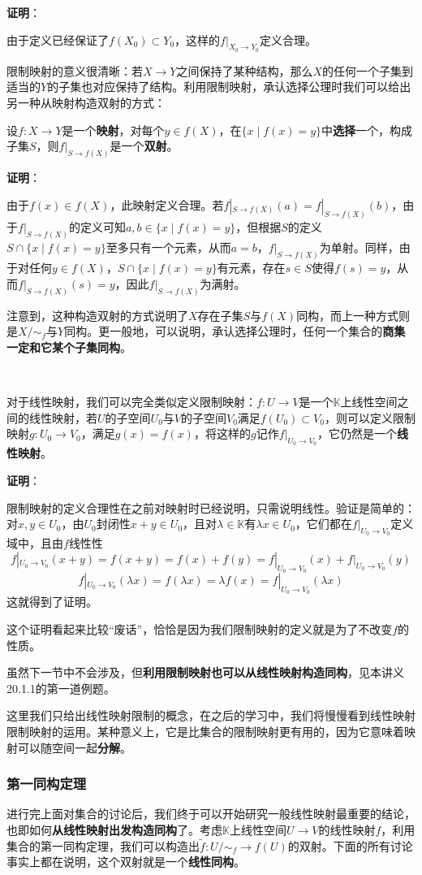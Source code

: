\documentclass[a4paper,UTF8,fontset=windows,AutoFakeBold]{ctexart}
\newcommand*{\note}{\noindent *}
\newcommand{\proo}[1]{{\vspace{5pt}\kaishu\noindent\textbf{证明}：\vspace{-3pt}
\begin{compactitem}
    \item[] #1
\end{compactitem}
}}
\begin{document}
\proo{
    由于定义已经保证了$f(X_0)\subset Y_0$，这样的$f|_{X_0\to Y_0}$定义合理。
}

限制映射的意义很清晰：若$X\to Y$之间保持了某种结构，那么$X$的任何一个子集到适当的$Y$的子集也对应保持了结构。利用限制映射，承认选择公理时我们可以给出另一种从映射构造双射的方式：

设$f:X\to Y$是一个\textbf{映射}，对每个$y\in f(X)$，在$\{x\mid f(x)=y\}$中\textbf{选择}一个，构成子集$S$，则$f|_{S\to f(X)}$是一个\textbf{双射}。

\proo{
    由于$f(x)\in f(X)$，此映射定义合理。若$f|_{S\to f(X)}(a)=f|_{S\to f(X)}(b)$，由于$f|_{S\to f(X)}$的定义可知$a,b\in\{x\mid f(x)=y\}$，但根据$S$的定义$S\cap\{x\mid f(x)=y\}$至多只有一个元素，从而$a=b$，$f|_{S\to f(X)}$为单射。同样，由于对任何$y\in f(X)$，$S\cap\{x\mid f(x)=y\}$有元素，存在$s\in S$使得$f(s)=y$，从而$f|_{S\to f(X)}(s)=y$，因此$f|_{S\to f(X)}$为满射。
}

注意到，这种构造双射的方式说明了$X$存在子集$S$与$f(X)$同构，而上一种方式则是$X/\sim_f$与$Y$同构。更一般地，可以说明，承认选择公理时，任何一个集合的\textbf{商集一定和它某个子集同构}。

\

对于线性映射，我们可以完全类似定义限制映射：$f:U\to V$是一个$\mathbb{K}$上线性空间之间的线性映射，若$U$的子空间$U_0$与$V$的子空间$V_0$满足$f(U_0)\subset V_0$，则可以定义限制映射$g:U_0\to V_0$，满足$g(x)=f(x)$，将这样的$g$记作$f|_{U_0\to V_0}$，它仍然是一个\textbf{线性映射}。

\proo{
    限制映射的定义合理性在之前对映射时已经说明，只需说明线性。验证是简单的：对$x,y\in U_0$，由$U_0$封闭性$x+y\in U_0$，且对$\lambda\in\mathbb{K}$有$\lambda x\in U_0$，它们都在$f|_{U_0\to V_0}$定义域中，且由$f$线性性
    $$f|_{U_0\to V_0}(x+y)=f(x+y)=f(x)+f(y)=f|_{U_0\to V_0}(x)+f|_{U_0\to V_0}(y)$$
    $$f|_{U_0\to V_0}(\lambda x)=f(\lambda x)=\lambda f(x)=f|_{U_0\to V_0}(\lambda x)$$
    这就得到了证明。
}

\note 这个证明看起来比较``废话''，恰恰是因为我们限制映射的定义就是为了不改变$f$的性质。

\note 虽然下一节中不会涉及，但\textbf{利用限制映射也可以从线性映射构造同构}，见本讲义20.1.1的第一道例题。

这里我们只给出线性映射限制的概念，在之后的学习中，我们将慢慢看到线性映射限制映射的运用。某种意义上，它是比集合的限制映射更有用的，因为它意味着映射可以随空间一起\textbf{分解}。

\subsubsection{第一同构定理}
进行完上面对集合的讨论后，我们终于可以开始研究一般线性映射最重要的结论，也即如何\textbf{从线性映射出发构造同构}了。考虑$\mathbb{K}$上线性空间$U\to V$的线性映射$f$，利用集合的第一同构定理，我们可以构造出$\tilde{f}:U/\sim_f\to f(U)$的双射。下面的所有讨论事实上都在说明，这个双射就是一个\textbf{线性同构}。
\end{document}
